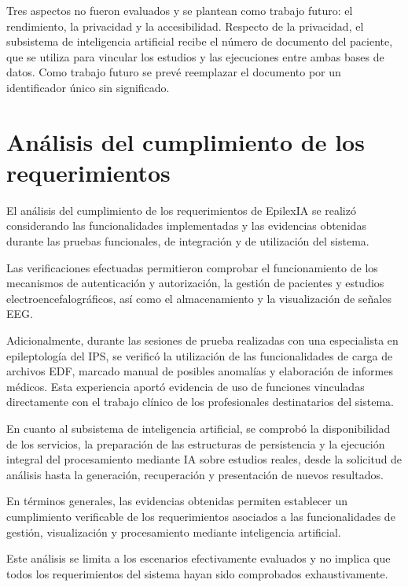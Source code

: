 Tres aspectos no fueron evaluados y se plantean como trabajo futuro: el rendimiento, la privacidad y la accesibilidad.
Respecto de la privacidad, el subsistema de inteligencia artificial recibe el número de documento del paciente, que se utiliza para vincular los estudios y las ejecuciones entre ambas bases de datos.
Como trabajo futuro se prevé reemplazar el documento por un identificador único sin significado.


\clearpage
\section[Análisis del cumplimiento de los requerimientos]{Análisis del cumplimiento de los \\requerimientos}

El análisis del cumplimiento de los requerimientos
de EpilexIA se realizó considerando las
funcionalidades implementadas y las evidencias
obtenidas durante las pruebas funcionales,
de integración y de utilización del sistema.

Las verificaciones efectuadas permitieron
comprobar el funcionamiento de los mecanismos
de autenticación y autorización, la gestión
de pacientes y estudios electroencefalográficos,
así como el almacenamiento y la visualización
de señales EEG.

Adicionalmente, durante las sesiones de prueba
realizadas con una especialista en epileptología
del IPS, se verificó la utilización de las
funcionalidades de carga de archivos EDF,
marcado manual de posibles anomalías y
elaboración de informes médicos. Esta
experiencia aportó evidencia de uso de
funciones vinculadas directamente con el
trabajo clínico de los profesionales
destinatarios del sistema.


En cuanto al subsistema de inteligencia artificial, se comprobó la disponibilidad de los servicios, la preparación de las estructuras de persistencia y la ejecución integral del procesamiento mediante IA sobre estudios reales, desde la solicitud de análisis hasta la generación, recuperación y presentación de nuevos resultados.


En términos generales, las evidencias obtenidas permiten establecer un cumplimiento verificable de los requerimientos asociados a las funcionalidades de gestión, visualización y procesamiento mediante inteligencia artificial.

Este análisis se limita a los escenarios
efectivamente evaluados y no implica que
todos los requerimientos del sistema hayan
sido comprobados exhaustivamente.


